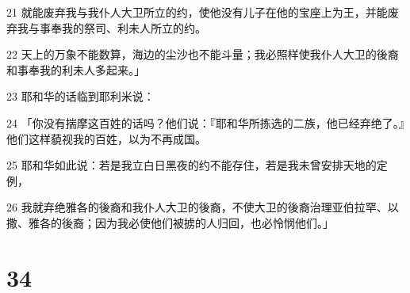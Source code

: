 \par 21 就能废弃我与我仆人大卫所立的约，使他没有儿子在他的宝座上为王，并能废弃我与事奉我的祭司、利未人所立的约。
\par 22 天上的万象不能数算，海边的尘沙也不能斗量；我必照样使我仆人大卫的後裔和事奉我的利未人多起来。」
\par 23 耶和华的话临到耶利米说：
\par 24 「你没有揣摩这百姓的话吗？他们说：『耶和华所拣选的二族，他已经弃绝了。』他们这样藐视我的百姓，以为不再成国。
\par 25 耶和华如此说：若是我立白日黑夜的约不能存住，若是我未曾安排天地的定例，
\par 26 我就弃绝雅各的後裔和我仆人大卫的後裔，不使大卫的後裔治理亚伯拉罕、以撒、雅各的後裔；因为我必使他们被掳的人归回，也必怜悯他们。」

\chapter{34}

